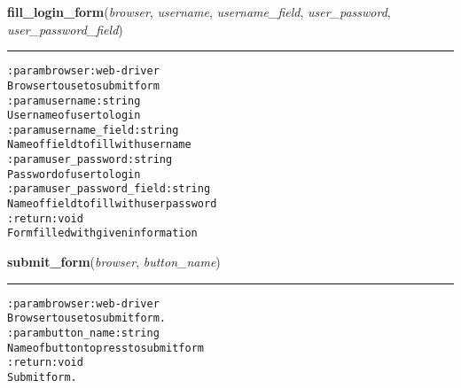     \vspace{0.5ex}

\hspace{.8\funcindent}\begin{boxedminipage}{\funcwidth}

    \raggedright \textbf{fill\_login\_form}(\textit{browser}, \textit{username}, \textit{username\_field}, \textit{user\_password}, \textit{user\_password\_field})

    \vspace{-1.5ex}

    \rule{\textwidth}{0.5\fboxrule}
\setlength{\parskip}{2ex}
\begin{alltt}

:param browser: web-driver
    Browser to use to submit form
:param username: string
    Username of user to login
:param username\_field: string
    Name of field to fill with username
:param user\_password: string
    Password of user to login
:param user\_password\_field: string
    Name of field to fill with user password
:return: void
    Form filled with given information
\end{alltt}

\setlength{\parskip}{1ex}
    \end{boxedminipage}

    \label{hal:internet:selenium_bots:SeleniumForm:submit_form}

    \vspace{0.5ex}

\hspace{.8\funcindent}\begin{boxedminipage}{\funcwidth}

    \raggedright \textbf{submit\_form}(\textit{browser}, \textit{button\_name})

    \vspace{-1.5ex}

    \rule{\textwidth}{0.5\fboxrule}
\setlength{\parskip}{2ex}
\begin{alltt}

:param browser: web-driver
    Browser to use to submit form.
:param button\_name: string
    Name of button to press to submit form
:return: void
    Submit form.
\end{alltt}

\setlength{\parskip}{1ex}
    \end{boxedminipage}

